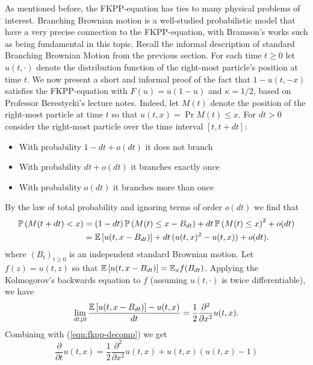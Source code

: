 As mentioned before, the FKPP-equation has ties to many physical problems of interest. Branching Brownian motion is a well-studied probabilistic model that have a very precise connection to the FKPP-equation, with Bramson's works such as \cite{bramson1983convergence,bramson1978maximal} being fundamental in this topic. Recall the informal description of standard Branching Brownian Motion from the previous section. For each time $t \geq 0$ let $u(t, \cdot)$ denote the distribution function of the right-most particle's position at time $t$. We now present a short and informal proof of the fact that $1 - u(t, - x)$ satisfies the FKPP-equation with $F(u) = u(1 - u)$ and $\kappa = 1/2$, based on Professor Berestycki's lecture notes. Indeed, let $M(t)$ denote the position of the right-most particle at time $t$ so that $u(t, x) = \Pr{M(t) \leq x}$. For $dt > 0$ consider the right-most particle over the time interval $[t, t+dt]$:
\begin{itemize}
\item \vspace{-2mm}With probability $1 - dt + o(dt)$ it does not branch
\item \vspace{-2mm}With probability $dt + o(dt)$ it branches exactly once
\item \vspace{-2mm}With probability $o(dt)$ it branches more than once
\end{itemize}	
By the law of total probability and ignoring terms of order $o(dt)$ we find that 
\begin{align}
\mathbb{P} \left( M(t + dt) < x \right) &= (1 - dt)\, \mathbb{P} \left( M(t) \leq x - B_{dt} \right) + dt\, \mathbb{P} \left( M(t) \leq x \right)^2 + o(dt)\nonumber \\
				   &= \mathbb{E}\left[ u(t, x - B_{dt}) \right] + dt\, (u(t,x)^2 - u(t,x)) + o(dt). \label{eqn:fkpp-decomp} 
\end{align}
where $(B_t)_{t \geq 0}$ is an independent standard Brownian motion. Let $f(z) = u(t, z)$ so that $\mathbb{E}\left[ u(t, x - B_{dt}) \right] = \mathbb{E}_x f(B_{dt})$. Applying the Kolmogorov's backwards equation to $f$ (assuming $u(t, \cdot)$ is twice differentiable), we have 
\begin{equation}\nonumber
\lim\limits_{dt \downarrow 0} \frac{\mathbb{E}\left[ u(t, x - B_{dt}) \right] - u(t, x)}{dt} = \frac{1}{2} \frac{\partial^2}{\partial x^2} u(t, x). 
\end{equation}
Combining with (\ref{eqn:fkpp-decomp}) we get 
\begin{equation}\label{eqn:shitty_FKPP}
\frac{\partial}{\partial t} u(t, x) = \frac{1}{2} \frac{\partial^2}{\partial x^2} u(t, x) + u(t, x)(u(t, x) - 1)
\end{equation}
